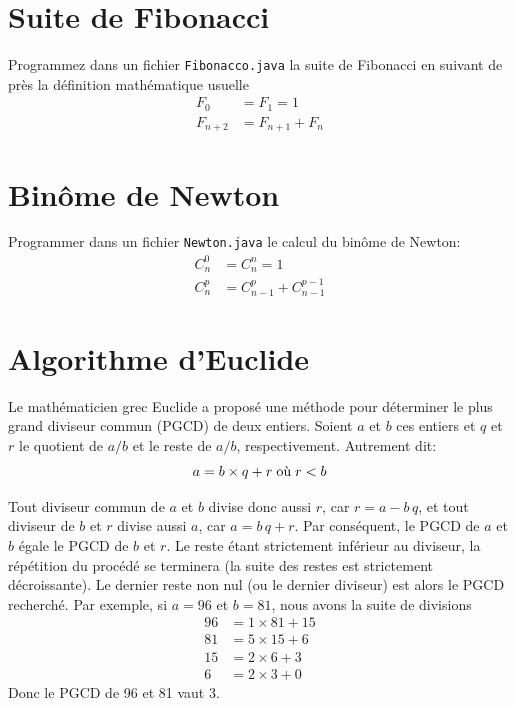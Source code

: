\documentclass[11pt,a4paper]{article}
\begin{document}
\section{Suite de Fibonacci}

\noindent Programmez dans un fichier \texttt{Fibonacco.java} la suite
de Fibonacci en suivant de près la définition mathématique usuelle
\begin{align*}
  F_0 &= F_1 = 1 \\
  F_{n+2} & = F_{n+1} + F_{n}
\end{align*}


\section{Binôme de Newton}

\noindent Programmer dans un fichier \texttt{Newton.java} le calcul
du binôme de Newton:
\begin{align*}
  C_{n}^{0} &= C_{n}^{n} = 1\\
  C_{n}^{p} &= C_{n-1}^{p} + C_{n-1}^{p-1}
\end{align*}

\section{Algorithme d'Euclide}

Le mathématicien grec Euclide a proposé une méthode pour déterminer le
plus grand diviseur commun (PGCD) de deux entiers. Soient $a$ et $b$
ces entiers et $q$ et $r$ le quotient de $a/b$ et le reste de $a/b$,
respectivement. Autrement dit:
$$a = b \times q + r \; \textnormal{où} \; r < b $$

Tout diviseur commun de $a$ et $b$ divise donc aussi $r$, car $r=a - b
\, q$, et tout diviseur de $b$ et $r$ divise aussi $a$, car $a=b \, q+
r $. Par conséquent, le PGCD de $a$ et $b$ égale le PGCD de $b$ et
$r$. Le reste étant strictement inférieur au diviseur, la répétition
du procédé se terminera (la suite des restes est strictement
décroissante). Le dernier reste non nul (ou le dernier diviseur) est
alors le PGCD recherché. Par exemple, si $a=96$ et $b=81$, nous avons
la suite de divisions
\begin{align*}
96 &= 1 \times 81 + 15\\
81 &= 5 \times 15 + 6\\
15 &= 2 \times 6 + 3\\
6 &= 2 \times 3 + 0
\end{align*}
\noindent Donc le PGCD de 96 et 81 vaut 3.
\end{document}
